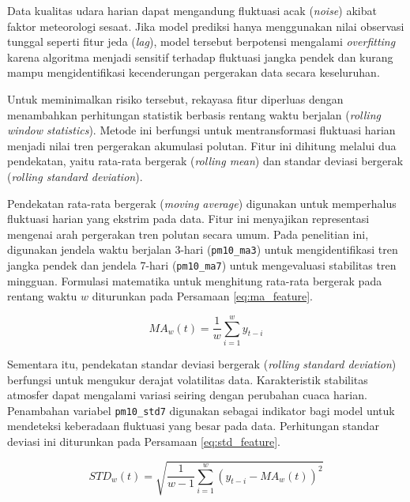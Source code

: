 Data kualitas udara harian dapat mengandung fluktuasi acak (\textit{noise}) akibat faktor meteorologi sesaat. Jika model prediksi hanya menggunakan nilai observasi tunggal seperti fitur jeda (\textit{lag}), model tersebut berpotensi mengalami \textit{overfitting} karena algoritma menjadi sensitif terhadap fluktuasi jangka pendek dan kurang mampu mengidentifikasi kecenderungan pergerakan data secara keseluruhan.

Untuk meminimalkan risiko tersebut, rekayasa fitur diperluas dengan menambahkan perhitungan statistik berbasis rentang waktu berjalan (\textit{rolling window statistics}). Metode ini berfungsi untuk mentransformasi fluktuasi harian menjadi nilai tren pergerakan akumulasi polutan. Fitur ini dihitung melalui dua pendekatan, yaitu rata-rata bergerak (\textit{rolling mean}) dan standar deviasi bergerak (\textit{rolling standard deviation}).

\newpage

Pendekatan rata-rata bergerak (\textit{moving average}) digunakan untuk memperhalus fluktuasi harian yang ekstrim pada data. Fitur ini menyajikan representasi mengenai arah pergerakan tren polutan secara umum. Pada penelitian ini, digunakan jendela waktu berjalan 3-hari (\texttt{pm10\_ma3}) untuk mengidentifikasi tren jangka pendek dan jendela 7-hari (\texttt{pm10\_ma7}) untuk mengevaluasi stabilitas tren mingguan. Formulasi matematika untuk menghitung rata-rata bergerak pada rentang waktu $w$ diturunkan pada Persamaan \ref{eq:ma_feature}.

\begin{equation}
MA_w(t) = \frac{1}{w} \sum_{i=1}^{w} y_{t-i}
\label{eq:ma_feature}
\end{equation}

Sementara itu, pendekatan standar deviasi bergerak (\textit{rolling standard deviation}) berfungsi untuk mengukur derajat volatilitas data. Karakteristik stabilitas atmosfer dapat mengalami variasi seiring dengan perubahan cuaca harian. Penambahan variabel \texttt{pm10\_std7} digunakan sebagai indikator bagi model untuk mendeteksi keberadaan fluktuasi yang besar pada data. Perhitungan standar deviasi ini diturunkan pada Persamaan \ref{eq:std_feature}.

\begin{equation}
STD_w(t) = \sqrt{\frac{1}{w-1} \sum_{i=1}^{w} \left( y_{t-i} - MA_w(t) \right)^2}
\label{eq:std_feature}
\end{equation}
